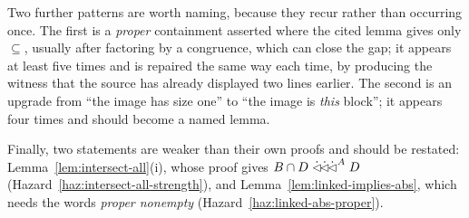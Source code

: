 Two further patterns are worth naming, because they recur rather than occurring
once. The first is a \emph{proper} containment asserted where the cited lemma
gives only $\subseteq$, usually after factoring by a congruence, which can
close the gap; it appears at least five times and is repaired the same way each
time, by producing the witness that the source has already displayed two lines
earlier. The second is an upgrade from ``the image has size one'' to ``the
image is \emph{this} block''; it appears four times and should become a named
lemma.

Finally, two statements are weaker than their own proofs and should be
restated: Lemma~\ref{lem:intersect-all}(i), whose proof gives
$B\cap D\mathrel{\dot{\lhd}\!\dot{\lhd}\!\dot{\lhd}}^{A}D$ (Hazard~\ref{haz:intersect-all-strength}), and
Lemma~\ref{lem:linked-implies-abs}, which needs the words \emph{proper
nonempty} (Hazard~\ref{haz:linked-abs-proper}).

